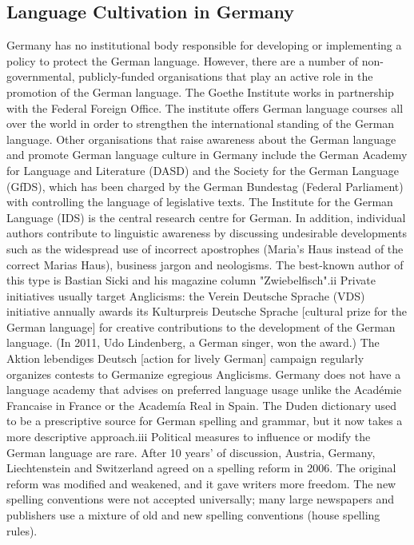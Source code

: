 \documentclass[]{../metanetpaper}
\begin{document}
	\subsection{Language Cultivation in Germany}
Germany has no institutional body responsible for developing or implementing a policy to protect the German language. However, there are a number of non-governmental, publicly-funded organisations that play an active role in the promotion of the German language. The Goethe Institute works in partnership with the Federal Foreign Office. The institute offers German language courses all over the world in order to strengthen the international standing of the German language. Other organisations that raise awareness about the German language and promote German language culture in Germany include the German Academy for Language and Literature (DASD) and the Society for the German Language (GfDS), which has been charged by the German Bundestag (Federal Parliament) with controlling the language of legislative texts. The Institute for the German Language (IDS) is the central research centre for German. 
In addition, individual authors contribute to linguistic awareness by discussing undesirable developments such as the widespread use of incorrect apostrophes (Maria’s Haus instead of the correct Marias Haus), business jargon and neologisms. The best-known author of this type is Bastian Sicki and his magazine column "Zwiebelfisch".ii Private initiatives usually target Anglicisms: the Verein Deutsche Sprache (VDS) initiative annually awards its Kulturpreis Deutsche Sprache [cultural prize for the German language] for creative contributions to the development of the German language. (In 2011, Udo Lindenberg, a German singer, won the award.) The Aktion lebendiges Deutsch [action for lively German] campaign regularly organizes contests to Germanize egregious Anglicisms. 
Germany does not have a language academy that advises on preferred language usage unlike the Académie Francaise in France or the Academía Real in Spain. The Duden dictionary used to be a prescriptive source for German spelling and grammar, but it now takes a more descriptive approach.iii 
Political measures to influence or modify the German language are rare. After 10 years’ of discussion, Austria, Germany, Liechtenstein and Switzerland agreed on a spelling reform in 2006. The original reform was modified and weakened, and it gave writers more freedom. The new spelling conventions were not accepted universally; many large newspapers and publishers use a mixture of old and new spelling conventions (house spelling rules).
\end{document}
